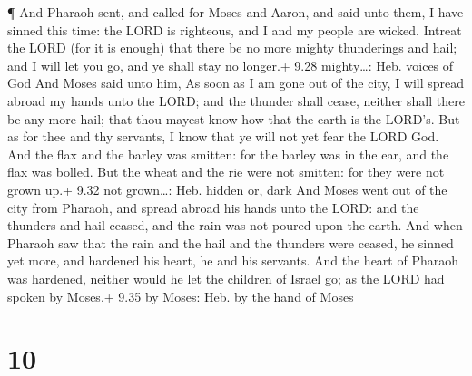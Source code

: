  ¶ And Pharaoh sent, and called for Moses and Aaron, and
said unto them, I have sinned this time: the LORD is righteous, and I
and my people are wicked.  Intreat the LORD (for it is
enough) that there be no more mighty thunderings and hail; and I will
let you go, and ye shall stay no longer.+ 9.28 mighty\ldots: Heb. voices
of God  And Moses said unto him, As soon as I am gone out
of the city, I will spread abroad my hands unto the LORD; and the
thunder shall cease, neither shall there be any more hail; that thou
mayest know how that the earth is the LORD's.  But as for
thee and thy servants, I know that ye will not yet fear the LORD God.
 And the flax and the barley was smitten: for the barley
was in the ear, and the flax was bolled.  But the wheat and
the rie were not smitten: for they were not grown up.+ 9.32 not
grown\ldots: Heb. hidden or, dark  And Moses went out of
the city from Pharaoh, and spread abroad his hands unto the LORD: and
the thunders and hail ceased, and the rain was not poured upon the
earth.  And when Pharaoh saw that the rain and the hail and
the thunders were ceased, he sinned yet more, and hardened his heart, he
and his servants.  And the heart of Pharaoh was hardened,
neither would he let the children of Israel go; as the LORD had spoken
by Moses.+ 9.35 by Moses: Heb. by the hand of Moses

\hypertarget{section-9}{%
\section{10}\label{section-9}}

